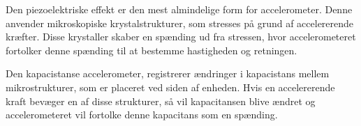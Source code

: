 Den piezoelektriske effekt er den mest almindelige form for accelerometer. Denne anvender mikroskopiske krystalstrukturer, som stresses på grund af accelererende kræfter. Disse krystaller skaber en spænding ud fra stressen, hvor accelerometeret fortolker denne spænding til at bestemme hastigheden og retningen.

Den kapacistanse accelerometer, registrerer ændringer i kapacistans mellem mikrostrukturer, som er placeret ved siden af enheden. Hvis en accelererende kraft bevæger en af disse strukturer, så vil kapacitansen blive ændret og accelerometeret vil fortolke denne kapacitans som en spænding.  \citep{Goodrich2013}
